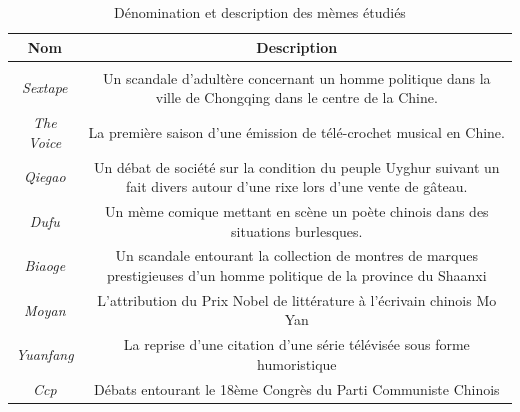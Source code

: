 \begin{table}[h!]
  \begin{tabulary}{\textwidth}{c|C}

    \textbf{Nom} &
    \textbf{Description}\\
    \hline \\[-1.5ex]
    \textit{S}\textit{extape}\textit{ } &
    Un scandale d{\textquoteright}adult\`ere concernant un homme politique
    dans la ville de Chongqing dans le centre de la Chine.\\[2ex]

    \textit{The Voice } &
    La premi\`ere saison d{\textquoteright}une \'emission de
    t\'el\'e-crochet musical en Chine.\\[2ex]

    \textit{Qiegao } &
    Un d\'ebat de soci\'et\'e sur la condition du peuple Uyghur suivant un
    fait divers autour d{\textquoteright}une rixe lors
    d{\textquoteright}une vente de g\^ateau.\\[2ex]

    \textit{Dufu} &
    Un m\`eme comique mettant en sc\`ene un po\`ete chinois dans des
    situations burlesques.\\[2ex]

    \textit{Biaoge} &
    Un scandale entourant la collection de montres de marques prestigieuses
    d{\textquoteright}un homme politique de la province du Shaanxi \\[2ex]

    \textit{Moyan} &
    L{\textquoteright}attribution du Prix Nobel de litt\'erature \`a
    l{\textquoteright}\'ecrivain chinois Mo Yan\\[2ex]

    \textit{Yuanfang} &
    La reprise d{\textquoteright}une citation d{\textquoteright}une s\'erie
    t\'el\'evis\'ee sous forme humoristique\\[2ex]

    \textit{Ccp} &
    D\'ebats entourant le 18\`eme Congr\`es du Parti Communiste Chinois\\[2ex]

  \end{tabulary}
  \caption{D\'enomination et description des m\`emes \'etudi\'es}
\end{table}

